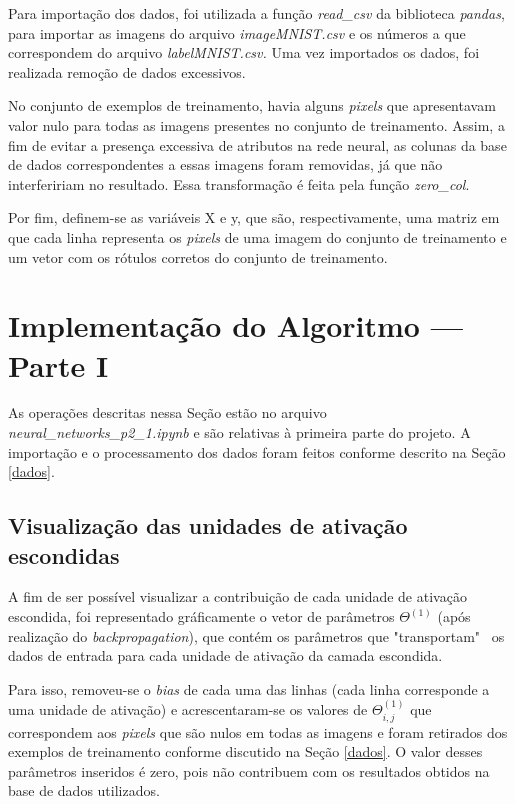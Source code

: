 \documentclass[12pt]{article}
\begin{document}
Para importação dos dados, foi utilizada a função \textit{read\_csv} da biblioteca \textit{pandas}, para importar as imagens do arquivo \textit{imageMNIST.csv} e os números a que correspondem do arquivo \textit{labelMNIST.csv.} Uma vez importados os dados, foi realizada remoção de dados excessivos.

No conjunto de exemplos de treinamento, havia alguns \textit{pixels} que apresentavam valor nulo para todas as imagens presentes no conjunto de treinamento. Assim, a fim de evitar a presença excessiva de atributos na rede neural, as colunas da base de dados correspondentes a essas imagens foram removidas, já que não interfeririam no resultado. Essa transformação é feita pela função \textit{zero\_col}.

Por fim, definem-se as variáveis X e y, que são, respectivamente, uma matriz em que cada linha representa os \textit{pixels} de uma imagem do conjunto de treinamento e um vetor com os rótulos corretos do conjunto de treinamento.

\section{Implementação do Algoritmo --- Parte I} \label{parte1}
As operações descritas nessa Seção estão no arquivo \textit{neural\_networks\_p2\_1.ipynb} e são relativas à primeira parte do projeto. A importação e o processamento dos dados foram feitos conforme descrito na Seção \ref{dados}.


\subsection{Visualização das unidades de ativação escondidas}
A fim de ser possível visualizar a contribuição de cada unidade de ativação escondida, foi representado gráficamente o vetor de parâmetros $\Theta^{(1)}$ (após realização do \textit{backpropagation}), que contém os parâmetros que "transportam" \ os dados de entrada para cada unidade de ativação da camada escondida.

Para isso, removeu-se o \textit{bias} de cada uma das linhas (cada linha corresponde a uma unidade de ativação) e acrescentaram-se os valores de $\Theta^{(1)}_{i,j}$ que correspondem aos \textit{pixels} que são nulos em todas as imagens e foram retirados dos exemplos de treinamento conforme discutido na Seção \ref{dados}. O valor desses parâmetros inseridos é zero, pois não contribuem com os resultados obtidos na base de dados utilizados.
\end{document}
